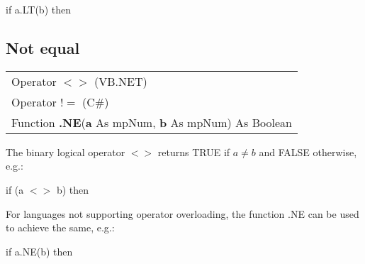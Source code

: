 \textsf{if a.LT(b) then}




\subsection{Not equal}
\begin{tabular}{p{481pt}}
	\toprule
	\textsf{Operator $\boldsymbol{<>}$} (VB.NET)\index{Multiprecision Functions!=} \\
	\textsf{Operator $\boldsymbol{!=}$} (C\#)\index{Multiprecision Functions!=} \\
	\midrule
	\textsf{Function \textbf{.NE}(\textbf{a} As mpNum, \textbf{b} As mpNum) As Boolean}\index{Multiprecision Functions!.NE} \\
	\bottomrule
\end{tabular}

\vspace{0.3cm}
The binary logical operator $\boldsymbol{<>}$ returns TRUE if  $a \neq b$ and FALSE otherwise, e.g.: 

\textsf{if (a $<>$ b) then}

For languages not supporting operator overloading, the function \textsf{.NE} can be used to achieve the same, e.g.: 

\textsf{if a.NE(b) then}


